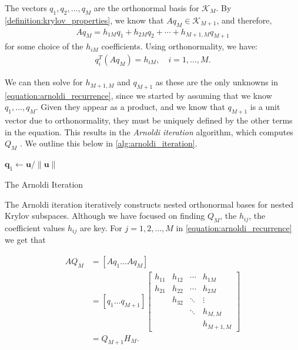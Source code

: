 The vectors $q_1, q_2, \ldots, q_M$ are the orthonormal basis for $\mathcal{K}_M$. By \cref{definition:krylov_properties}, we know that $A q_M \in \mathcal{K}_{M+1}$, and therefore,
\begin{align}
A q_M = h_{1M} q_1 + h_{2M} q_2 + \cdots + h_{M+1,M} q_{M+1}
\label{equation:arnoldi_recurrence}
\end{align}
for some choice of the $h_{iM}$ coefficients. Using orthonormality, we have:
\begin{align}
q_i^T(A q_M) = h_{iM}, \quad i = 1,\ldots,M.
\label{equation:cij_projection}
\end{align}

We can then solve for $h_{M+1,M}$ and $q_{M+1}$ as these are the only unknowns in \cref{equation:arnoldi_recurrence}, since we started by assuming that we know $q_1, \ldots, q_M$. Given they appear as a product, and we know that $q_{M+1}$ is a unit vector due to orthonormality, they must be uniquely defined by the other terms in the equation. This results in the \textit{Arnoldi iteration} algorithm, which computes $Q_M$ \citep{krylov_book}. We outline this below in \cref{alg:arnoldi_iteration}.

\begin{algorithm}[H]
    \DontPrintSemicolon
    $\mathbf{q}_1 \leftarrow \mathbf{u} / \|\mathbf{u}\|$\; 
    \caption{The Arnoldi Iteration}
    \label{alg:arnoldi_iteration}
\end{algorithm}

The Arnoldi iteration iteratively constructs nested orthonormal bases for nested Krylov subspaces. Although we have focused on finding $Q_M$, the $h_{ij}$, the coefficient values $h_{ij}$ are key. For $j = 1,2,\ldots,M$ in \cref{equation:arnoldi_recurrence} we get that

\begin{align}
AQ_M &= [Aq_1 \ldots Aq_M] \nonumber \\
&= [q_1 \ldots q_{M+1}]
\begin{bmatrix} 
h_{11} & h_{12} & \cdots & h_{1M} \\ 
h_{21} & h_{22} & \cdots & h_{2M} \\ 
       & h_{32} & \ddots & \vdots \\ 
       &        & \ddots & h_{M,M} \\
       &        &        & h_{M+1,M}
\end{bmatrix} \nonumber \\
&= Q_{M+1} H_M.
\label{equation:arnoldi_identity}
\end{align}

